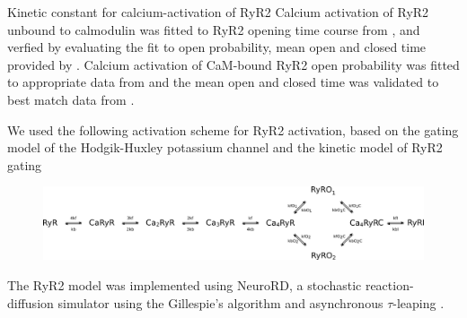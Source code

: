 \documentclass[9pt,lineno]{elife}
\begin{document}
Kinetic constant for calcium-activation of RyR2 Calcium activation of RyR2 unbound to calmodulin was fitted to RyR2 opening time course from \citep{ca_stoichiometry_ryr}, and verfied by evaluating the fit to open probability, mean open and closed time provided by \citep{xu_meissner_2004}. Calcium activation of CaM-bound RyR2 open probability was fitted to appropriate data from \citep{xu_meissner_2004} and the mean open and closed time was validated to best match data from \citep{xu_meissner_2004}.

We used the following activation scheme for RyR2 activation, based on the gating model of the Hodgik-Huxley potassium channel \citep{johnston_wu} and the kinetic model of RyR2 gating \citep{Zahradnikova_kon,ca_stoichiometry_ryr}
\begin{figure}
\includegraphics[width=0.95\linewidth]{RyR_Ca_activation_scheme.png}
\caption{\label{fig:RyR2activation}}
\end{figure}


The RyR2 model was implemented using NeuroRD, a stochastic reaction-diffusion simulator using the Gillespie's algorithm and asynchronous $\tau$-leaping \citep{neurord_tau_leaping}.



\end{document}

